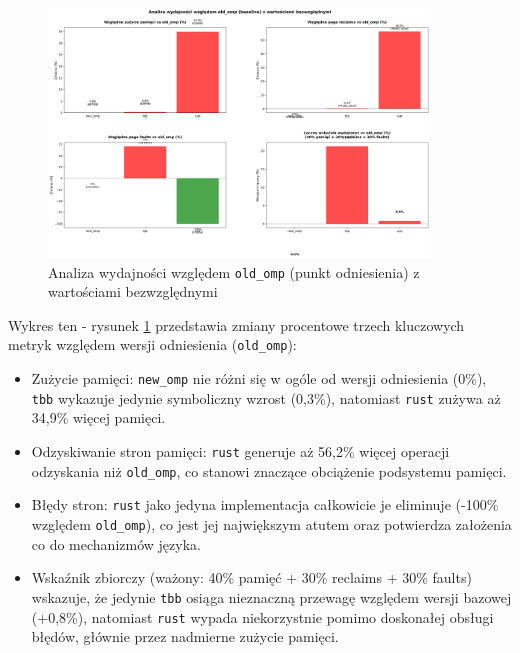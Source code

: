 \begin{figure}[H]
    \centering
    \includegraphics[width=0.9\textwidth]{analiza/images/parallel/is/arm/chart_05_performance_ratios.png}
    \caption{Analiza wydajności względem \texttt{old\_omp} (punkt odniesienia) z wartościami bezwzględnymi}
    \label{is_analiza_wzgledem_old_omp}
\end{figure}
Wykres ten - rysunek \ref{is_analiza_wzgledem_old_omp} przedstawia zmiany procentowe trzech kluczowych metryk względem wersji odniesienia (\texttt{old\_omp}):
\begin{itemize}
    \item Zużycie pamięci: \texttt{new\_omp} nie różni się w ogóle od wersji odniesienia (0\%), \texttt{tbb} wykazuje jedynie symboliczny wzrost (0,3\%), natomiast \texttt{rust} zużywa aż 34,9\% więcej pamięci.
    \item Odzyskiwanie stron pamięci: \texttt{rust} generuje aż 56,2\% więcej operacji odzyskania niż \texttt{old\_omp}, co stanowi znaczące obciążenie podsystemu pamięci.
    \item Błędy stron: \texttt{rust} jako jedyna implementacja całkowicie je eliminuje (-100\% względem \texttt{old\_omp}), co jest jej największym atutem oraz potwierdza założenia co do mechanizmów języka.
    \item Wskaźnik zbiorczy (ważony: 40\% pamięć + 30\% reclaims + 30\% faults) wskazuje, że jedynie \texttt{tbb} osiąga nieznaczną przewagę względem wersji bazowej (+0,8\%), natomiast \texttt{rust} wypada niekorzystnie pomimo doskonałej obsługi błędów, głównie przez nadmierne zużycie pamięci.
\end{itemize}



